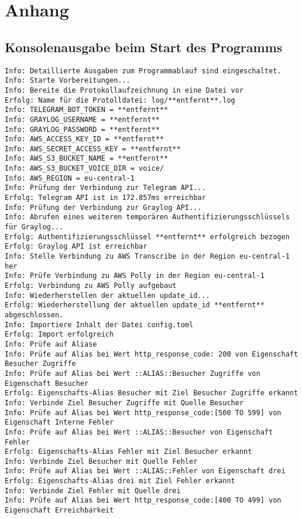 \appendix
\chapter{Anhang}
\label{cha:anhang}

\section{Konsolenausgabe beim Start des Programms}
\begin{lstlisting}[label=log-start, numbers=none]
Info: Detaillierte Ausgaben zum Programmablauf sind eingeschaltet. 
Info: Starte Vorbereitungen... 
Info: Bereite die Protokollaufzeichnung in eine Datei vor 
Erfolg: Name für die Protolldatei: log/**entfernt**.log 
Info: TELEGRAM_BOT_TOKEN = **entfernt** 
Info: GRAYLOG_USERNAME = **entfernt**
Info: GRAYLOG_PASSWORD = **entfernt**
Info: AWS_ACCESS_KEY_ID = **entfernt**
Info: AWS_SECRET_ACCESS_KEY = **entfernt**
Info: AWS_S3_BUCKET_NAME = **entfernt**
Info: AWS_S3_BUCKET_VOICE_DIR = voice/ 
Info: AWS_REGION = eu-central-1 
Info: Prüfung der Verbindung zur Telegram API... 
Erfolg: Telegram API ist in 172.857ms erreichbar 
Info: Prüfung der Verbindung zur Graylog API... 
Info: Abrufen eines weiteren temporären Authentifizierungsschlüssels für Graylog... 
Erfolg: Authentifizierungsschlüssel **entfernt** erfolgreich bezogen 
Erfolg: Graylog API ist erreichbar 
Info: Stelle Verbindung zu AWS Transcribe in der Region eu-central-1 her 
Info: Prüfe Verbindung zu AWS Polly in der Region eu-central-1 
Erfolg: Verbindung zu AWS Polly aufgebaut 
Info: Wiederherstellen der aktuellen update_id... 
Erfolg: Wiederherstellung der aktuellen update_id **entfernt** abgeschlossen. 
Info: Importiere Inhalt der Datei config.toml 
Erfolg: Import erfolgreich 
Info: Prüfe auf Aliase 
Info: Prüfe auf Alias bei Wert http_response_code: 200 von Eigenschaft Besucher Zugriffe 
Info: Prüfe auf Alias bei Wert ::ALIAS::Besucher Zugriffe von Eigenschaft Besucher 
Erfolg: Eigenschafts-Alias Besucher mit Ziel Besucher Zugriffe erkannt 
Info: Verbinde Ziel Besucher Zugriffe mit Quelle Besucher 
Info: Prüfe auf Alias bei Wert http_response_code:[500 TO 599] von Eigenschaft Interne Fehler 
Info: Prüfe auf Alias bei Wert ::ALIAS::Besucher von Eigenschaft Fehler 
Erfolg: Eigenschafts-Alias Fehler mit Ziel Besucher erkannt 
Info: Verbinde Ziel Besucher mit Quelle Fehler 
Info: Prüfe auf Alias bei Wert ::ALIAS::Fehler von Eigenschaft drei 
Erfolg: Eigenschafts-Alias drei mit Ziel Fehler erkannt 
Info: Verbinde Ziel Fehler mit Quelle drei 
Info: Prüfe auf Alias bei Wert http_response_code:[400 TO 499] von Eigenschaft Erreichbarkeit 

\end{lstlisting}
